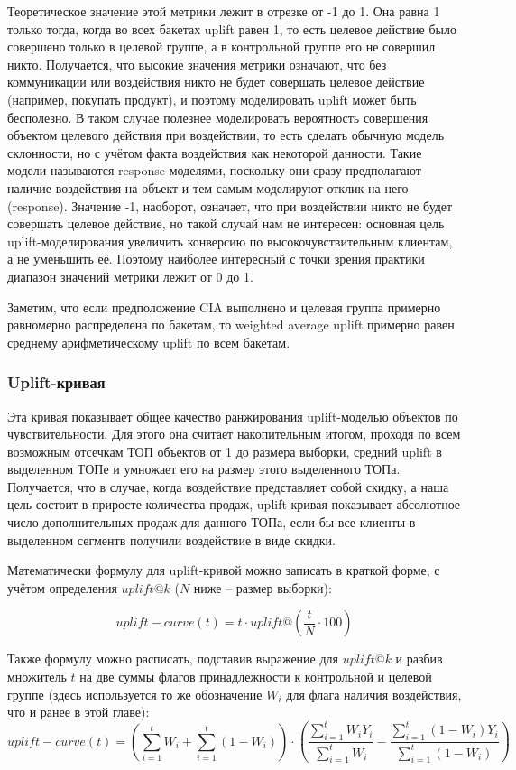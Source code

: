 Теоретическое значение этой метрики лежит в отрезке от -1 до 1. Она равна 1 только тогда, когда во всех бакетах uplift равен 1, то есть целевое действие было совершено только в целевой группе, а в контрольной группе его не совершил никто. Получается, что высокие значения метрики означают, что без коммуникации или воздействия никто не будет совершать целевое действие (например, покупать продукт), и поэтому моделировать uplift может быть бесполезно. В таком случае полезнее моделировать вероятность совершения объектом целевого действия при воздействии, то есть сделать обычную модель склонности, но с учётом факта воздействия как некоторой данности. Такие модели называются response-моделями, поскольку они сразу предполагают наличие воздействия на объект и тем самым моделируют отклик на него (response). Значение -1, наоборот, означает, что при воздействии никто не будет совершать целевое действие, но такой случай нам не интересен: основная цель uplift-моделирования увеличить конверсию по высокочувствительным клиентам, а не уменьшить её. Поэтому наиболее интересный с точки зрения практики диапазон значений метрики лежит от 0 до 1.

Заметим, что если предположение CIA выполнено и целевая группа примерно равномерно распределена по бакетам, то weighted average uplift примерно равен среднему арифметическому uplift по всем бакетам.


\subsubsection*{Uplift-кривая}

Эта кривая показывает общее качество ранжирования uplift-моделью объектов по чувствительности. Для этого она считает накопительным итогом, проходя по всем возможным отсечкам ТОП объектов от 1 до размера выборки, средний uplift в выделенном ТОПе и умножает его на размер этого выделенного ТОПа. Получается, что в случае, когда воздействие представляет собой скидку, а наша цель состоит в приросте количества продаж, uplift-кривая показывает абсолютное число дополнительных продаж для данного ТОПа, если бы все клиенты в выделенном сегментв получили воздействие в виде скидки.

Математически формулу для uplift-кривой можно записать в краткой форме, с учётом определения $uplift@k$ ($N$ ниже -- размер выборки):

$$
    uplift-curve(t) = t \cdot uplift@ \left( \frac{t}{N} \cdot 100 \right)
$$

Также формулу можно расписать, подставив выражение для $uplift@k$ и разбив множитель $t$ на две суммы флагов принадлежности к контрольной и целевой группе (здесь используется то же обозначение $W_i$ для флага наличия воздействия, что и ранее в этой главе):
$$
    uplift-curve(t) =
        \left(
            \sum\limits_{i=1}^{t} W_i
            +
            \sum\limits_{i=1}^{t} (1 - W_i)
        \right)
        \cdot
        \left(
            \frac{
                \sum\limits_{i=1}^{t} W_i Y_i
            }{
                \sum\limits_{i=1}^{t} W_i
            }
            -
            \frac{
                \sum\limits_{i=1}^{t} (1 - W_i) Y_i
            }{
                \sum\limits_{i=1}^{t} (1 - W_i)
            }
        \right)
$$

